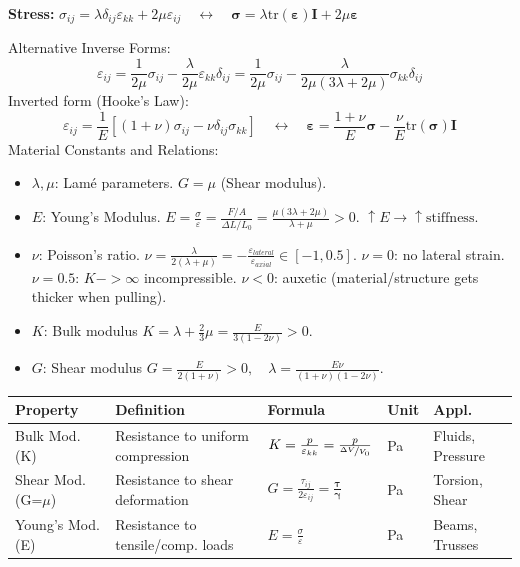 \documentclass[10pt,twocolumn, a4paper]{article}
\begin{document}
\textbf{Stress:} $ \boxed{\sigma_{ij} = \lambda \delta_{ij} \varepsilon_{kk} + 2\mu \varepsilon_{ij}} \quad \leftrightarrow \quad \bm{\sigma} = \lambda \text{tr}(\bm{\varepsilon})\bm{I} + 2\mu \bm{\varepsilon} $

Alternative Inverse Forms:
\[ \varepsilon_{ij} = \frac{1}{2\mu} \sigma_{ij} - \frac{\lambda}{2\mu} \varepsilon_{kk} \delta_{ij} = \frac{1}{2\mu} \sigma_{ij} - \frac{\lambda}{2\mu(3\lambda+2\mu)} \sigma_{kk} \delta_{ij} \]
Inverted form (Hooke's Law):
\[ \boxed{\varepsilon_{ij} = \frac{1}{E} [(1+\nu)\sigma_{ij} - \nu \delta_{ij} \sigma_{kk}]} \quad\leftrightarrow\quad \bm{\varepsilon} = \frac{1+\nu}{E} \bm{\sigma} - \frac{\nu}{E} \text{tr}(\bm{\sigma})\bm{I} \]
Material Constants and Relations:
\begin{itemize}
    \item $\lambda, \mu$: Lamé parameters. $G = \mu$ (Shear modulus).
    \item $E$: Young's Modulus. $E = \frac{\sigma}{\varepsilon} = \frac{F/A}{\Delta L/L_0} = \frac{\mu(3\lambda + 2\mu)}{\lambda + \mu} > 0$. $\uparrow E \rightarrow \uparrow \text{stiffness}$.
    \item $\nu$: Poisson's ratio. $\nu = \frac{\lambda}{2(\lambda+\mu)} = -\frac{\varepsilon_{lateral}}{\varepsilon_{axial}} \in [-1, 0.5]$. 
        \subitem $\nu = 0$: no lateral strain.
        \subitem $\nu = 0.5$: $K->\infty$ incompressible.
        \subitem $\nu < 0$: auxetic (material/structure gets thicker when pulling).
    \item $K$: Bulk modulus $K = \lambda + \frac{2}{3}\mu = \frac{E}{3(1-2\nu)} > 0$.
    \item $G$: Shear modulus $G = \frac{E}{2(1+\nu)} > 0, \quad \lambda = \frac{E\nu}{(1+\nu)(1-2\nu)}$.
\end{itemize}

\begin{center}

\small
\begin{tabular}{|p{1.3cm}|p{2.0cm}|l|p{0.6cm}|p{1.2cm}|}
    \hline
    \textbf{Property} & \textbf{Definition} & \textbf{Formula} &\textbf{Unit} & \textbf{Appl.} \\ \hline
    Bulk Mod. (K) & Resistance to uniform compression & $K = \frac{p}{\varepsilon_{kk}}=\frac{p}{\nicefrac{\Delta V}{V_0}}$ & Pa & Fluids, Pressure \\ \hline
    Shear Mod. (G=$\mu$) & Resistance to shear deformation & $G = \frac{\tau_{ij}}{2\varepsilon_{ij}}=\frac{\bm{\tau}}{\bm{\gamma}}$ & Pa & Torsion, Shear \\ \hline
    Young's Mod. (E) & Resistance to tensile/comp. loads & $E = \frac{\sigma}{\varepsilon}$ & Pa & Beams, Trusses \\ \hline
\end{tabular}
\end{center}
\end{document}

